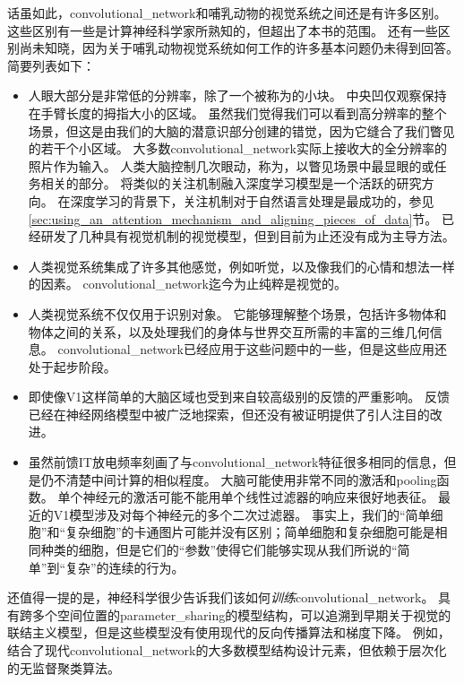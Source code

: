 话虽如此，\gls{convolutional_network}和哺乳动物的视觉系统之间还是有许多区别。
这些区别有一些是计算神经科学家所熟知的，但超出了本书的范围。
还有一些区别尚未知晓，因为关于哺乳动物视觉系统如何工作的许多基本问题仍未得到回答。
简要列表如下：
\begin{itemize}
  \item 人眼大部分是非常低的分辨率，除了一个被称为的小块。
  中央凹仅观察保持在手臂长度的拇指大小的区域。
  虽然我们觉得我们可以看到高分辨率的整个场景，但这是由我们的大脑的潜意识部分创建的错觉，因为它缝合了我们瞥见的若干个小区域。
  大多数\gls{convolutional_network}实际上接收大的全分辨率的照片作为输入。
  人类大脑控制几次眼动，称为，以瞥见场景中最显眼的或任务相关的部分。
  将类似的关注机制融入深度学习模型是一个活跃的研究方向。
  在深度学习的背景下，关注机制对于自然语言处理是最成功的，参见\ref{sec:using_an_attention_mechanism_and_aligning_pieces_of_data}节。
  已经研发了几种具有视觉机制的视觉模型，但到目前为止还没有成为主导方法\citep{Larochelle2010,Denil2012}。
  
  \item 人类视觉系统集成了许多其他感觉，例如听觉，以及像我们的心情和想法一样的因素。
  \gls{convolutional_network}迄今为止纯粹是视觉的。
  
  \item 人类视觉系统不仅仅用于识别对象。
  它能够理解整个场景，包括许多物体和物体之间的关系，以及处理我们的身体与世界交互所需的丰富的三维几何信息。
  \gls{convolutional_network}已经应用于这些问题中的一些，但是这些应用还处于起步阶段。
  
  \item 即使像V1这样简单的大脑区域也受到来自较高级别的反馈的严重影响。
  反馈已经在神经网络模型中被广泛地探索，但还没有被证明提供了引人注目的改进。
  
  \item 虽然前馈IT放电频率刻画了与\gls{convolutional_network}特征很多相同的信息，但是仍不清楚中间计算的相似程度。
  大脑可能使用非常不同的激活和\gls{pooling}函数。
  单个神经元的激活可能不能用单个线性过滤器的响应来很好地表征。
  最近的V1模型涉及对每个神经元的多个二次过滤器\citep{rust:2005}。
  事实上，我们的``简单细胞''和``复杂细胞''的卡通图片可能并没有区别；简单细胞和复杂细胞可能是相同种类的细胞，但是它们的``参数''使得它们能够实现从我们所说的``简单''到``复杂''的连续的行为。
\end{itemize}
 
 
还值得一提的是，神经科学很少告诉我们该如何\emph{训练}\gls{convolutional_network}。
具有跨多个空间位置的\gls{parameter_sharing}的模型结构，可以追溯到早期关于视觉的联结主义模型\citep{Marr76}，但是这些模型没有使用现代的反向传播算法和梯度下降。
例如，\citep{Fukushima80}结合了现代\gls{convolutional_network}的大多数模型结构设计元素，但依赖于层次化的无监督聚类算法。


